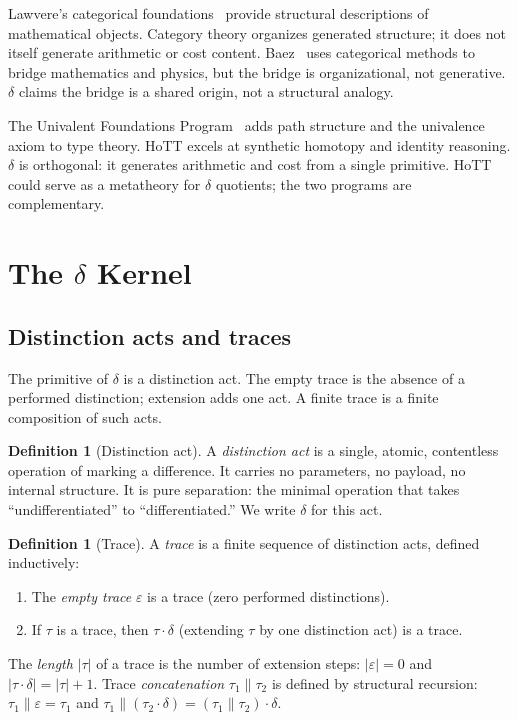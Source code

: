 \documentclass[11pt,a4paper]{article}
\theoremstyle{definition}
\newtheorem{definition}[theorem]{Definition}
\theoremstyle{remark}
\begin{document}
Lawvere's categorical foundations~\cite{Lawvere1964} provide structural
descriptions of mathematical objects. Category theory organizes generated
structure; it does not itself generate arithmetic or cost content.
Baez~\cite{Baez2006} uses categorical methods to bridge mathematics and
physics, but the bridge is organizational, not generative. $\delta$ claims
the bridge is a shared origin, not a structural analogy.

The Univalent Foundations Program~\cite{HoTT2013} adds path structure and the
univalence axiom to type theory. HoTT excels at synthetic homotopy and identity
reasoning. $\delta$ is orthogonal: it generates arithmetic and cost from a
single primitive. HoTT could serve as a metatheory for $\delta$ quotients; the
two programs are complementary.

\section{The $\delta$ Kernel}\label{sec:kernel}

\subsection{Distinction acts and traces}

The primitive of $\delta$ is a distinction act. The empty trace is the
absence of a performed distinction; extension adds one act. A finite trace is
a finite composition of such acts.

\begin{definition}[Distinction act]\label{def:act}
A \emph{distinction act} is a single, atomic, contentless operation of marking
a difference. It carries no parameters, no payload, no internal structure. It
is pure separation: the minimal operation that takes ``undifferentiated'' to
``differentiated.'' We write $\delta$ for this act.
\end{definition}

\begin{definition}[Trace]\label{def:trace}
A \emph{trace} is a finite sequence of distinction acts, defined inductively:
\begin{enumerate}[leftmargin=2em, label=(\roman*)]
  \item The \emph{empty trace} $\varepsilon$ is a trace (zero performed
    distinctions).
  \item If $\tau$ is a trace, then $\tau \cdot \delta$ (extending $\tau$ by
    one distinction act) is a trace.
\end{enumerate}
The \emph{length} $|\tau|$ of a trace is the number of extension steps:
$|\varepsilon| = 0$ and $|\tau \cdot \delta| = |\tau| + 1$. Trace
\emph{concatenation} $\tau_1 \mathbin{\|} \tau_2$ is defined by structural
recursion: $\tau_1 \mathbin{\|} \varepsilon = \tau_1$ and
$\tau_1 \mathbin{\|} (\tau_2 \cdot \delta) = (\tau_1 \mathbin{\|} \tau_2)
\cdot \delta$.
\end{definition}
\end{document}
